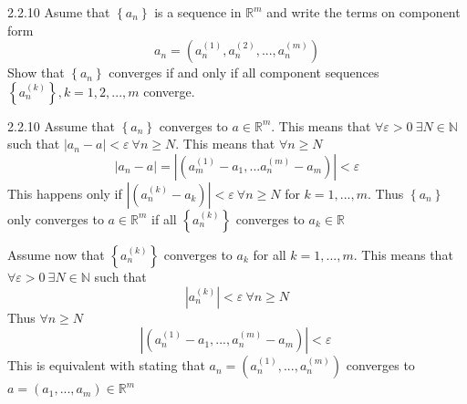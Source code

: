 \documentclass[a4paper,norsk]{article}
\renewcommand{\geq}{\geqslant}
\renewcommand{\epsilon}{\varepsilon}
\begin{document}
\begin{oppgavebox}{2.2.10}{}
Asume that $ \left\{ a_n \right\}  $ is a sequence in $ \mathbb{R}^m $ and write the terms on component form
\[
    a_n = \left( a_n^{(1)}, a_n^{(2)}, ..., a_n^{(m)} \right) 
\]
Show that $ \left\{ a_n \right\}  $ converges if and only if all component sequences $ \left\{ a_n^{(k)} \right\}, k=1, 2, ... , m  $ converge.

\begin{proofbox}{2.2.10}{}
  Assume that $ \left\{ a_n \right\}  $ converges to $ a \in \mathbb{R}^m $. This means that $ \forall \epsilon > 0 \: \exists  N \in  \mathbb{N} $ such that $ \left| a_n - a \right| < \epsilon \: \forall n \geq N  $.
  This means that $ \forall n \geq N $ 
  \[
      \left| a_n - a \right| = \left| \left( a_m^{(1)} - a_1, ... a_n^{(m)} - a_m \right)  \right| < \epsilon 
  \]
  This happens only if $ \left| \left( a_n^{(k)} - a_k \right)  \right| < \epsilon \: \forall n \geq N $ for $ k = 1, ..., m $. Thus $ \left\{ a_n \right\}  $ only converges to $ a \in \mathbb{R}^m $ if all $ \left\{ a_n^{(k)} \right\}  $ converges to $ a_k \in \mathbb{R} $ 


  Assume now that $ \left\{ a_n^{(k)} \right\}  $ converges to $ a_k $ for all $ k= 1, ..., m $. This means that $ \forall \epsilon > 0 \: \exists  N \in \mathbb{N} $ such that
  \[
      \left| a_n^{(k)} \right| < \epsilon  \: \forall  n \geq N
  \]
  Thus $ \forall  n\geq N $ 
  \[
      \left| \left( a_n^{(1)} - a_1, ..., a_n^{(m)} - a_m \right)  \right| < \epsilon \
  \]
  This is equivalent with stating that $ a_n = \left( a_n^{(1)}, ..., a_n^{(m)} \right)  $ converges to $ a = \left( a_1, ..., a_m \right) \in  \mathbb{R}^m $ 
  
  
\end{proofbox}

\end{oppgavebox}
\end{document}
